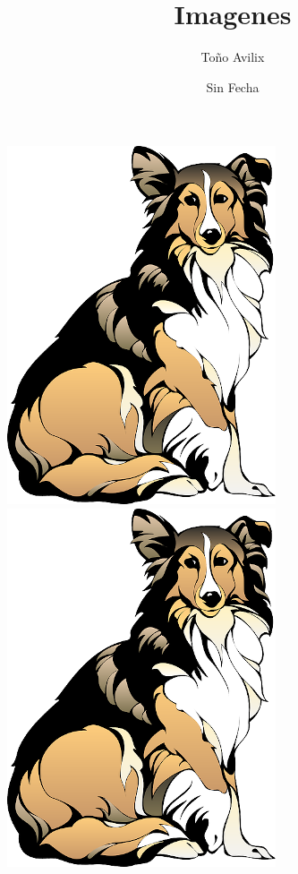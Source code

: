 \documentclass{article}
\title{Imagenes}
\author{Toño Avilix}
\date{Sin Fecha}
\begin{document}
\maketitle

\includegraphics{dog1.png}
\includegraphics[scale=1.5, angle=60]{dog1.png}
\end{document}
